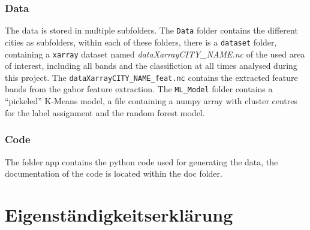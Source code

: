 \documentclass[12pt,a4paper, english,twoside]{article}
\begin{document}
  \subsubsection{Data}
    The data is stored in multiple subfolders. 
    The \texttt{Data} folder contains the different cities as subfolders, within each of these folders, there is a \texttt{dataset} folder, containing a \texttt{xarray} dataset named \textit{dataXarrayCITY\_NAME.nc} of the used area of interest, including all bands and the classifiction at all times analysed during this project. 
    The \texttt{dataXarrayCITY\_NAME\_feat.nc} contains the extracted feature bands from the gabor feature extraction.
    The \texttt{ML\_Model} folder contains a ``pickeled'' K-Means model, a file containing a numpy array with cluster centres for the label assignment and the random forest model. %
  \subsubsection{Code}
    The folder app contains the python code used for generating the data, the documentation of the code is located within the doc folder.
\newpage
\printbibliography%
\newpage
\section*{Eigenständigkeitserklärung}

\end{document}
